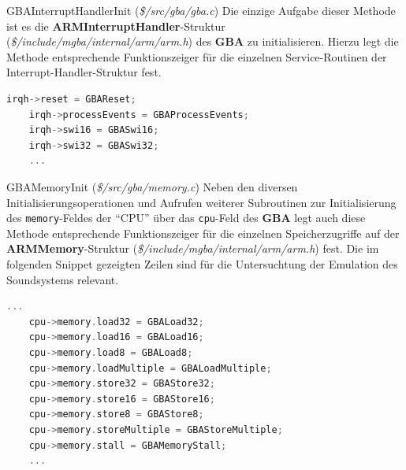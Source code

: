 \documentclass[11pt,a4paper]{scrartcl}
\begin{document}
\vspace{5mm}
\large GBAInterruptHandlerInit \normalsize(\textit{\$/src/gba/gba.c})
\vspace{2mm}\newline
Die einzige Aufgabe dieser Methode ist es die \textbf{ARMInterruptHandler}-Struktur (\textit{\$/include/mgba/internal/arm/arm.h}) des \textbf{GBA} zu initialisieren. Hierzu legt die Methode entsprechende Funktionszeiger f\"ur die einzelnen Service-Routinen der Interrupt-Handler-Struktur fest.

\vspace{5mm}
\begin{lstlisting}[language=C++, caption={Ausschnitt aus der \textbf{GBAInterruptHandlerInit}-Methode}, label={list:GBAInterruptHandlerInit}]
    irqh->reset = GBAReset;
    irqh->processEvents = GBAProcessEvents;
    irqh->swi16 = GBASwi16;
    irqh->swi32 = GBASwi32;
    ...
\end{lstlisting}

\vspace{5mm}
\large GBAMemoryInit \normalsize(\textit{\$/src/gba/memory.c})
\vspace{2mm}\newline
Neben den diversen Initialisierungsoperationen und Aufrufen weiterer Subroutinen zur Initialisierung des \verb|memory|-Feldes der \enquote{CPU} \"uber das \verb|cpu|-Feld des \textbf{GBA} legt auch diese Methode entsprechende Funktionszeiger f\"ur die einzelnen Speicherzugriffe auf der \textbf{ARMMemory}-Struktur (\textit{\$/include/mgba/internal/arm/arm.h}) fest. Die im folgenden Snippet gezeigten Zeilen sind f\"ur die Untersuchtung der Emulation des Soundsystems relevant.

\vspace{5mm}
\begin{lstlisting}[language=C++, caption={Ausschnitt aus der \textbf{GBAMemoryInit}-Methode}, label={list:GBAMemoryInit}]
    ...
    cpu->memory.load32 = GBALoad32;
    cpu->memory.load16 = GBALoad16;
    cpu->memory.load8 = GBALoad8;
    cpu->memory.loadMultiple = GBALoadMultiple;
    cpu->memory.store32 = GBAStore32;
    cpu->memory.store16 = GBAStore16;
    cpu->memory.store8 = GBAStore8;
    cpu->memory.storeMultiple = GBAStoreMultiple;
    cpu->memory.stall = GBAMemoryStall;
    ...
\end{lstlisting}
\end{document}

